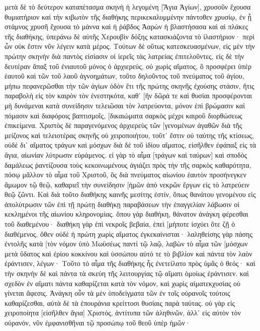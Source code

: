μετὰ δὲ τὸ δεύτερον καταπέτασμα σκηνὴ ἡ λεγομένη [Ἅγια Ἁγίων], 
χρυσοῦν ἔχουσα θυμιατήριον καὶ τὴν κιβωτὸν τῆς διαθήκης περικεκαλυμμένην πάντοθεν χρυσίῳ, ἐν ᾗ στάμνος χρυσῆ ἔχουσα τὸ μάννα καὶ ἡ ῥάβδος Ἀαρὼν ἡ βλαστήσασα καὶ αἱ πλάκες τῆς διαθήκης, 
ὑπεράνω δὲ αὐτῆς Χερουβὶν δόξης κατασκιάζοντα τὸ ἱλαστήριον· περὶ ὧν οὐκ ἔστιν νῦν λέγειν κατὰ μέρος. 
Τούτων δὲ οὕτως κατεσκευασμένων, εἰς μὲν τὴν πρώτην σκηνὴν διὰ παντὸς εἰσίασιν οἱ ἱερεῖς τὰς λατρείας ἐπιτελοῦντες, 
εἰς δὲ τὴν δευτέραν ἅπαξ τοῦ ἐνιαυτοῦ μόνος ὁ ἀρχιερεύς, οὐ χωρὶς αἵματος, ὃ προσφέρει ὑπὲρ ἑαυτοῦ καὶ τῶν τοῦ λαοῦ ἀγνοημάτων, 
τοῦτο δηλοῦντος τοῦ πνεύματος τοῦ ἁγίου, μήπω πεφανερῶσθαι τὴν τῶν ἁγίων ὁδὸν ἔτι τῆς πρώτης σκηνῆς ἐχούσης στάσιν, 
ἥτις παραβολὴ εἰς τὸν καιρὸν τὸν ἐνεστηκότα, καθ᾽ [ἣν δῶρά τε καὶ θυσίαι προσφέρονται μὴ δυνάμεναι κατὰ συνείδησιν τελειῶσαι τὸν λατρεύοντα, 
μόνον ἐπὶ βρώμασιν καὶ πόμασιν καὶ διαφόροις βαπτισμοῖς, [δικαιώματα σαρκὸς μέχρι καιροῦ διορθώσεως ἐπικείμενα. 
Χριστὸς δὲ παραγενόμενος ἀρχιερεὺς τῶν [γενομένων ἀγαθῶν διὰ τῆς μείζονος καὶ τελειοτέρας σκηνῆς οὐ χειροποιήτου, τοῦτ᾽ ἔστιν οὐ ταύτης τῆς κτίσεως, 
οὐδὲ δι᾽ αἵματος τράγων καὶ μόσχων διὰ δὲ τοῦ ἰδίου αἵματος, εἰσῆλθεν ἐφάπαξ εἰς τὰ ἅγια, αἰωνίαν λύτρωσιν εὑράμενος. 
εἰ γὰρ τὸ αἷμα [τράγων καὶ ταύρων] καὶ σποδὸς δαμάλεως ῥαντίζουσα τοὺς κεκοινωμένους ἁγιάζει πρὸς τὴν τῆς σαρκὸς καθαρότητα, 
πόσῳ μᾶλλον τὸ αἷμα τοῦ Χριστοῦ, ὃς διὰ πνεύματος αἰωνίου ἑαυτὸν προσήνεγκεν ἄμωμον τῷ θεῷ, καθαριεῖ τὴν συνείδησιν [ἡμῶν ἀπὸ νεκρῶν ἔργων εἰς τὸ λατρεύειν θεῷ ζῶντι. 
Καὶ διὰ τοῦτο διαθήκης καινῆς μεσίτης ἐστίν, ὅπως θανάτου γενομένου εἰς ἀπολύτρωσιν τῶν ἐπὶ τῇ πρώτῃ διαθήκῃ παραβάσεων τὴν ἐπαγγελίαν λάβωσιν οἱ κεκλημένοι τῆς αἰωνίου κληρονομίας. 
ὅπου γὰρ διαθήκη, θάνατον ἀνάγκη φέρεσθαι τοῦ διαθεμένου· 
διαθήκη γὰρ ἐπὶ νεκροῖς βεβαία, ἐπεὶ [μήποτε ἰσχύει ὅτε ζῇ ὁ διαθέμενος. 
ὅθεν οὐδὲ ἡ πρώτη χωρὶς αἵματος ἐγκεκαίνισται· 
λαληθείσης γὰρ πάσης ἐντολῆς κατὰ [τὸν νόμον ὑπὸ Μωϋσέως παντὶ τῷ λαῷ, λαβὼν τὸ αἷμα τῶν [μόσχων μετὰ ὕδατος καὶ ἐρίου κοκκίνου καὶ ὑσσώπου αὐτό τε τὸ βιβλίον καὶ πάντα τὸν λαὸν ἐράντισεν, 
λέγων· Τοῦτο τὸ αἷμα τῆς διαθήκης ἧς ἐνετείλατο πρὸς ὑμᾶς ὁ θεός· 
καὶ τὴν σκηνὴν δὲ καὶ πάντα τὰ σκεύη τῆς λειτουργίας τῷ αἵματι ὁμοίως ἐράντισεν. 
καὶ σχεδὸν ἐν αἵματι πάντα καθαρίζεται κατὰ τὸν νόμον, καὶ χωρὶς αἱματεκχυσίας οὐ γίνεται ἄφεσις. 
Ἀνάγκη οὖν τὰ μὲν ὑποδείγματα τῶν ἐν τοῖς οὐρανοῖς τούτοις καθαρίζεσθαι, αὐτὰ δὲ τὰ ἐπουράνια κρείττοσι θυσίαις παρὰ ταύτας. 
οὐ γὰρ εἰς χειροποίητα [εἰσῆλθεν ἅγια] Χριστός, ἀντίτυπα τῶν ἀληθινῶν, ἀλλ᾽ εἰς αὐτὸν τὸν οὐρανόν, νῦν ἐμφανισθῆναι τῷ προσώπῳ τοῦ θεοῦ ὑπὲρ ἡμῶν· 
